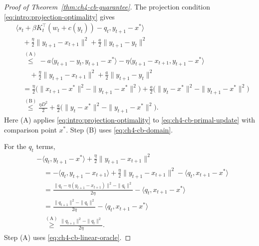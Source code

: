 \begin{proof}[Proof of Theorem~\ref{thm:ch4-cb-guarantee}]
The projection condition \eqref{eq:intro:projection-optimality} gives
\begin{equation}\label{eq:ch4-cb-quadratic-comparison}
\begin{aligned}
&\langle s_t+\beta K_t^\top(w_t+c(y_t))-q_t,y_{t+1}-x^*\rangle\\
&\quad+\frac\eta2\|y_{t+1}-x_{t+1}\|^2+\frac a2\|y_{t+1}-y_t\|^2\\
&\quad\overset{\mathrm{(A)}}{\le}
-a\langle y_{t+1}-y_t,y_{t+1}-x^*\rangle
-\eta\langle y_{t+1}-x_{t+1},y_{t+1}-x^*\rangle\\
&\qquad+\frac\eta2\|y_{t+1}-x_{t+1}\|^2+\frac a2\|y_{t+1}-y_t\|^2\\
&\quad=\frac\eta2\bigl(\|x_{t+1}-x^*\|^2-\|y_{t+1}-x^*\|^2\bigr)
+\frac a2\bigl(\|y_t-x^*\|^2-\|y_{t+1}-x^*\|^2\bigr)\\
&\quad\overset{\mathrm{(B)}}{\le}
\frac{\eta D^2}{2}
+\frac a2\bigl(\|y_t-x^*\|^2-\|y_{t+1}-x^*\|^2\bigr).
\end{aligned}
\end{equation}
\nopagebreak[3]
Here (A) applies \eqref{eq:intro:projection-optimality} to
\eqref{eq:ch4-cb-primal-update} with comparison point $x^*$.
Step (B) uses \eqref{eq:ch4-cb-domain}.

For the $q_t$ terms,
\begin{equation}\label{eq:ch4-cb-equality-identity}
\begin{aligned}
&-\langle q_t,y_{t+1}-x^*\rangle
+\frac\eta2\|y_{t+1}-x_{t+1}\|^2\\
&\quad=-\langle q_t,y_{t+1}-x_{t+1}\rangle
+\frac\eta2\|y_{t+1}-x_{t+1}\|^2
-\langle q_t,x_{t+1}-x^*\rangle\\
&\quad=\frac{\|q_t-\eta(y_{t+1}-x_{t+1})\|^2-\|q_t\|^2}{2\eta}
-\langle q_t,x_{t+1}-x^*\rangle\\
&\quad=\frac{\|q_{t+1}\|^2-\|q_t\|^2}{2\eta}
-\langle q_t,x_{t+1}-x^*\rangle\\
&\quad\overset{\mathrm{(A)}}{\ge}\frac{\|q_{t+1}\|^2-\|q_t\|^2}{2\eta}.
\end{aligned}
\end{equation}
\nopagebreak[3]
Step (A) uses \eqref{eq:ch4-cb-linear-oracle}.


\end{proof}
